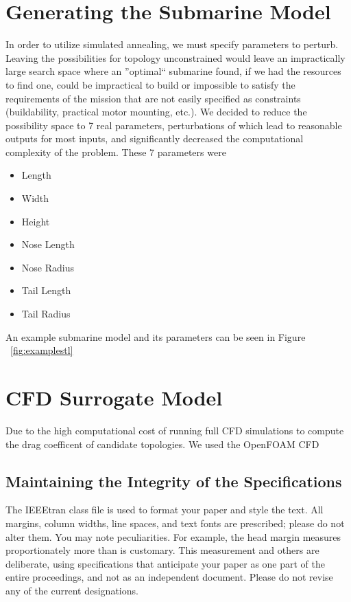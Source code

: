 \documentclass[conference]{IEEEtran}
\begin{document}
\section{Generating the Submarine Model}
In order to utilize simulated annealing, we must specify parameters to perturb. Leaving the possibilities for topology unconstrained would leave an impractically large search space where an ''optimal`` submarine found, if we had the resources to find one, could be impractical to build or impossible to satisfy the requirements of the mission that are not easily specified as constraints (buildability, practical motor mounting, etc.). We decided to reduce the possibility space to 7 real parameters, perturbations of which lead to reasonable outputs for most inputs, and significantly decreased the computational complexity of the problem. These 7 parameters were
\begin{itemize}
\item Length
\item Width
\item Height
\item Nose Length
\item Nose Radius
\item Tail Length
\item Tail Radius
\end{itemize}
An example submarine model and its parameters can be seen in Figure ~\ref{fig:examplestl}

\section{CFD Surrogate Model}
Due to the high computational cost of running full CFD simulations to compute the drag coefficent of candidate topologies. We used the OpenFOAM CFD


\subsection{Maintaining the Integrity of the Specifications}

The IEEEtran class file is used to format your paper and style the text. All margins,
column widths, line spaces, and text fonts are prescribed; please do not
alter them. You may note peculiarities. For example, the head margin
measures proportionately more than is customary. This measurement
and others are deliberate, using specifications that anticipate your paper
as one part of the entire proceedings, and not as an independent document.
Please do not revise any of the current designations.
\end{document}
